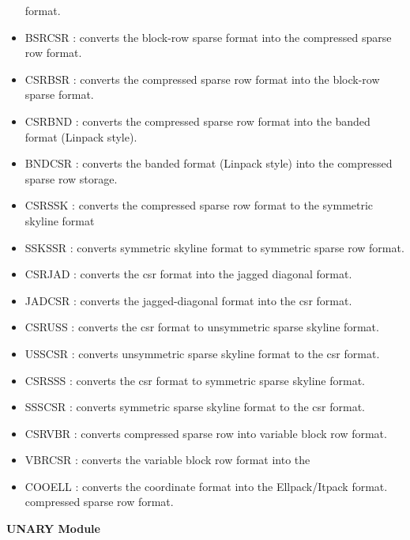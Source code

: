 \begin{itemize}
           format.                                                    
\item BSRCSR  : converts the block-row sparse format into the compressed       
           sparse row format.                                         
\item CSRBSR  : converts the compressed sparse row format into the block-row   
           sparse format.                                             
\item CSRBND  : converts the compressed sparse row format into the  banded   
           format (Linpack style).                                    
\item BNDCSR  : converts the banded format (Linpack style) into the compressed 
           sparse row storage.                                        
\item CSRSSK  : converts the compressed sparse row format to the symmetric
           skyline format                                           
\item SSKSSR  : converts symmetric skyline format to symmetric
sparse row           format.                             
\item CSRJAD  : converts the csr format into the jagged diagonal format.
\item JADCSR  : converts the jagged-diagonal format into the csr format.
\item CSRUSS  : converts the csr format to unsymmetric sparse skyline format.
\item USSCSR  : converts unsymmetric sparse skyline format to the csr format.
\item CSRSSS  : converts the csr format to symmetric sparse skyline format.
\item SSSCSR  : converts symmetric sparse skyline format to the csr format.
\item CSRVBR  : converts compressed sparse row into variable block row format.
\item VBRCSR  : converts the variable block row format into the
\item COOELL  : converts the coordinate format into the Ellpack/Itpack format.
compressed sparse row format.
\end{itemize}

\vskip 0.3in
\centerline{\bf UNARY Module}

